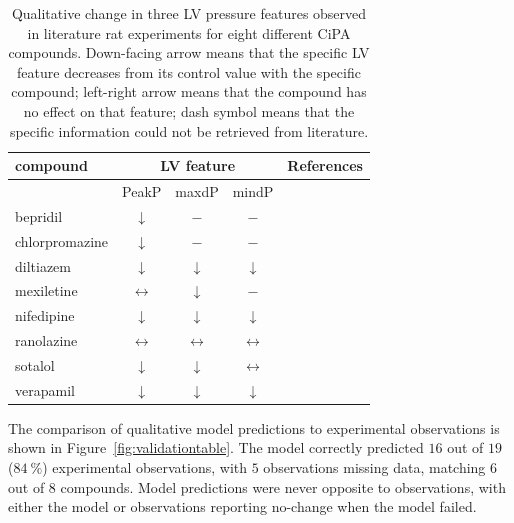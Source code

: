 \begin{table}[!ht]
    \myfloatalign
    \begin{tabular}{lcccl}
    \hline
    \textbf{compound}           & \multicolumn{3}{c}{\textbf{LV feature}} & \textbf{References} \\
    \hline
    & PeakP & maxdP & mindP & \\
    \hline
    bepridil       & $\downarrow$ & $-$ & $-$ & \cite{Leiris:1984, Amsterdam:1988, Huizer:1987} \\
    chlorpromazine & $\downarrow$ & $-$ & $-$ & \cite{Katsuoka:1989, Langslet:1971, Sakai:2017} \\
    diltiazem      & $\downarrow$ & $\downarrow$ & $\downarrow$ & \cite{Flaim:1982, Koltai:1989, Dong:1997} \\
    mexiletine     & $\leftrightarrow$ & $\downarrow$ & $-$ & \cite{Kamiyama:1995, Hesketh:2020, Marshall:1981} \\
    nifedipine     & $\downarrow$ & $\downarrow$ & $\downarrow$ & \cite{Dong:1997, Saponara:2007, Nishimura:1992} \\
    ranolazine     & $\leftrightarrow$ & $\leftrightarrow$ & $\leftrightarrow$ & \cite{Wang:2007, Hwang:2009, Wang:2019} \\
    sotalol        & $\downarrow$ & $\downarrow$ & $\leftrightarrow$ & \cite{Mackin:2019, Peralta:2000, Hoffmeister:1988} \\
    verapamil      & $\downarrow$ & $\downarrow$ & $\downarrow$ & \cite{Simonovic:2019, Stojic:2017, Kolar:1990} \\
    \hline
    \end{tabular}
    \caption{Qualitative change in three LV pressure features observed in literature rat experiments for eight different CiPA compounds. Down-facing arrow means that the specific LV feature decreases from its control value with the specific compound; left-right arrow means that the compound has no effect on that feature; dash symbol means that the specific information could not be retrieved from literature.}
    \label{tab:compoundvalidationrefs}
\end{table}

\vspace{0.2cm}\noindent
The comparison of qualitative model predictions to experimental observations is shown in Figure~\ref{fig:validationtable}. The model correctly predicted $16$ out of $19$ ($\SI{84}{\percent}$) experimental observations, with $5$ observations missing data, matching $6$ out of $8$ compounds. Model predictions were never opposite to observations, with either the model or observations reporting no-change when the model failed.

